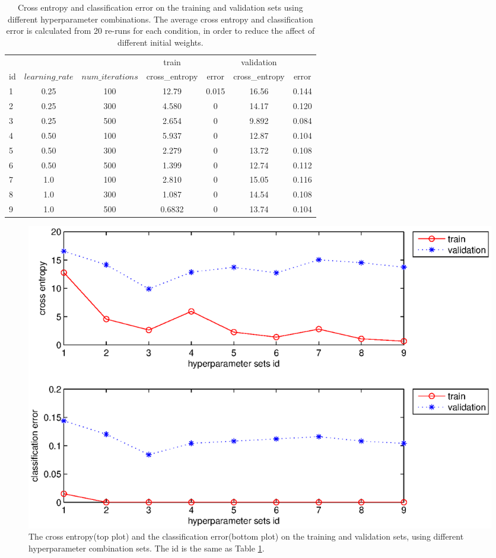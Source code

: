 \documentclass{article}
\begin{document}
\begin{table}[htbp]
\centering
\begin{tabular}{lcc|cc|cc}
\toprule
\ & \ & \ & train & \ & validation & \\
id & $learning\_rate$ & $num\_iterations$ & cross\_entropy & error & cross\_entropy & error \\
\midrule
1 & 0.25 & 100 & 12.79  & 0.015 & 16.56 & 0.144\\
2 & 0.25 & 300 & 4.580  & 0 & 14.17 & 0.120\\
3 & 0.25 & 500 & 2.654  & 0 & 9.892 & 0.084\\
4 & 0.50 & 100 & 5.937  & 0 & 12.87 & 0.104\\
5 & 0.50 & 300 & 2.279  & 0 & 13.72 & 0.108\\
6 & 0.50 & 500 & 1.399  & 0 & 12.74 & 0.112\\
7 & 1.0  & 100 & 2.810  & 0 & 15.05 & 0.116\\
8 & 1.0  & 300 & 1.087  & 0 & 14.54 & 0.108\\
9 & 1.0  & 500 & 0.6832 & 0 & 13.74 & 0.104\\
\bottomrule
\end{tabular}
\caption{Cross entropy and classification error on the training and validation sets using different hyperparameter combinations. The average cross entropy and classification error is calculated from 20 re-runs for each condition, in order to reduce the affect of different initial weights. 
\label{table:hyper}}
\end{table} 

\begin{figure}[htbp]
\centering
\includegraphics[width=\textwidth]{2-2-findhyper.eps}
\caption{The cross entropy(top plot) and the classification error(bottom plot) on the training and validation sets, using different hyperparameter combination sets. The id is the same as Table \ref{table:hyper}.
\label{fig:findhyper}}
\end{figure}
\end{document}
